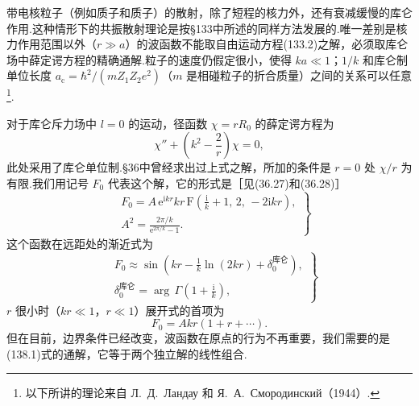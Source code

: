 带电核粒子（例如质子和质子）的散射，除了短程的核力外，还有衰减缓慢的库仑作用.这种情形下的共振散射理论是按§133中所述的同样方法发展的.唯一差别是核力作用范围以外（$r\gg a$）的波函数不能取自由运动方程(133.2)之解，必须取库仑场中薛定谔方程的精确通解.粒子的速度仍假定很小，使得 $ka\ll1$；$1/k$ 和库仑制单位长度
$a_{\mathrm{c}}=\hbar^2/(mZ_1Z_2e^2)$（$m$ 是相碰粒子的折合质量）之间的关系可以任意\footnote{以下所讲的理论来自 Л.~Д.~Ландау 和 Я.~А.~Смородинский（1944）.}.

对于库仑斥力场中 $l=0$ 的运动，径函数 $\chi=rR_0$ 的薛定谔方程为
\begin{equation}
  \chi''+\left(k^2-\frac{2}{r}\right)\chi=0,
\end{equation}
此处采用了库仑单位制.§36中曾经求出过上式之解，所加的条件是 $r=0$ 处 $\chi/r$ 为有限.我们用记号 $F_0$ 代表这个解，它的形式是［见(36.27)和(36.28)］
\begin{equation}
\left.
\begin{aligned}
  &F_0=A\,\mathrm{e}^{\mathrm{i}kr}kr\,
  \mathrm{F}\left(\frac{\mathrm{i}}{k}+1,\,2,\,-2\mathrm{i}kr\right),\\
  &A^2=\frac{2\pi/k}{\mathrm{e}^{2\pi/k}-1}.
\end{aligned}
\right\}
\end{equation}
这个函数在远距处的渐近式为
\begin{equation}
\left.
\begin{aligned}
  &F_0\approx\sin\left(kr-\frac{1}{k}\ln(2kr)
  +\delta_0^{\text{库仑}}\right),\\
  &\delta_0^{\text{库仑}}
  =\arg\,\Gamma\left(1+\frac{\mathrm{i}}{k}\right),
\end{aligned}
\right\}
\end{equation}
$r$ 很小时（$kr\ll1$，$r\ll1$）展开式的首项为
\begin{equation}
  F_0=Akr(1+r+\cdots).
\end{equation}
但在目前，边界条件已经改变，波函数在原点的行为不再重要，我们需要的是(138.1)式的通解，它等于两个独立解的线性组合.

